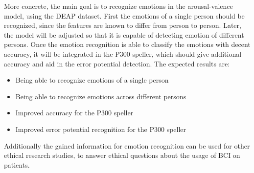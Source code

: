 \npar

More concrete, the main goal is to recognize emotions in the arousal-valence model, using the DEAP dataset. First the emotions of a single person should be recognized, since the features are known to differ from person to person. Later, the model will be adjusted so that it is capable of detecting emotion of different persons. Once the emotion recognition is able to classify the emotions with decent accuracy, it will be integrated in the P300 speller, which should give additional accuracy and aid in the error potential detection. The expected results are:
\begin{itemize}
\item Being able to recognize emotions of a single person
\item Being able to recognize emotions across different persons
\item Improved accuracy for the P300 speller
\item Improved error potential recognition for the P300 speller
\end{itemize}

\npar

Additionally the gained information for emotion recognition can be used for other ethical research studies, to answer ethical questions about the usage of BCI on patients.